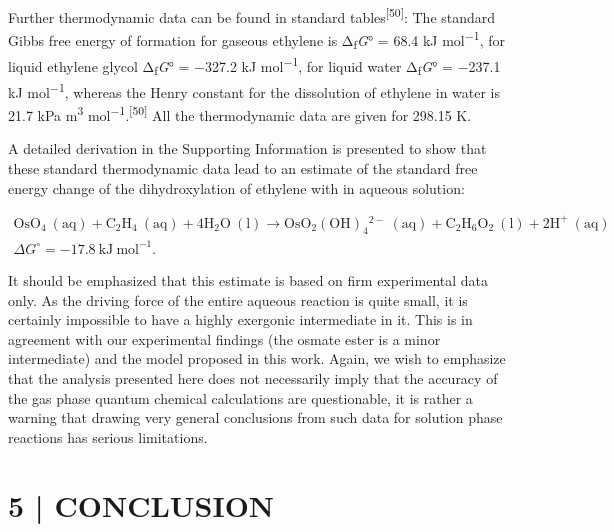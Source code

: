 \documentclass{article}
\begin{document}
Further thermodynamic data can be found in standard tables\textsuperscript{[50]}: The standard Gibbs free energy of formation for gaseous ethylene is Δ\textsubscript{f}\emph{G}° = 68.4 kJ mol\textsuperscript{−1}, for liquid ethylene glycol Δ\textsubscript{f}\emph{G}° = −327.2 kJ mol\textsuperscript{−1}, for liquid water Δ\textsubscript{f}\emph{G}° = −237.1 kJ mol\textsuperscript{−1}, whereas the Henry constant for the dissolution of ethylene in water is 21.7 kPa m\textsuperscript{3} mol\textsuperscript{−1}.\textsuperscript{[50]} All the thermodynamic data are given for 298.15 K.

A detailed derivation in the Supporting Information is presented to show that these standard thermodynamic data lead to an estimate of the standard free energy change of the dihydroxylation of ethylene with  in aqueous solution:

\begin{equation*}
\begin{gathered}
\mathrm{OsO_4\ (aq) + C_2H_4\ (aq) + 4H_2O\ (l) \rightarrow OsO_2(OH)_4{}^{2-}\ (aq) + C_2H_6O_2\ (l) + 2H^+\ (aq)}\\
\Delta G^\circ = -17.8\ \mathrm{kJ\ mol^{-1}}.
\end{gathered}
\end{equation*}

It should be emphasized that this estimate is based on firm experimental data only. As the driving force of the entire aqueous reaction is quite small, it is certainly impossible to have a highly exergonic intermediate in it. This is in agreement with our experimental findings (the osmate ester is a minor intermediate) and the model proposed in this work. Again, we wish to emphasize that the analysis presented here does not necessarily imply that the accuracy of the gas phase quantum chemical calculations are questionable, it is rather a warning that drawing very general conclusions from such data for solution phase reactions has serious limitations.

\section*{5 \quad | \quad CONCLUSION}
\end{document}
